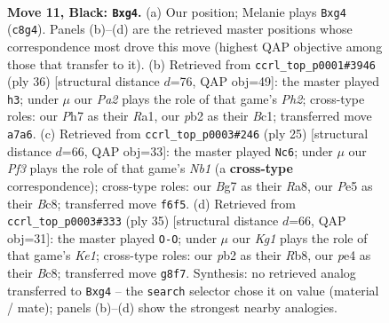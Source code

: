 \documentclass[11pt]{article}
\begin{document}
\clearpage

\begin{figure}[p]\centering
\begin{subfigure}{0.46\textwidth}\centering
\resizebox{\linewidth}{!}{%
\newchessgame
\chessboard[
  setfen={rnb2rk1/ppp3bp/5pp1/4p3/2P1P1P1/2N2N2/PP3PP1/1RBBK2R b K - 0 11},
  showmover=false,
  pgfstyle=straightmove, color=movearrow, markmove={c8-g4}
]}
\caption{}
\end{subfigure}\hfill
\begin{subfigure}{0.46\textwidth}\centering
\resizebox{\linewidth}{!}{%
\newchessgame
\chessboard[
  setfen={r3k2r/pp2bp2/2p1p1n1/3pP3/3P1PBn/2P5/PP1N3P/R1B2RK1 w kq - 3 19},
  showmover=false,
  pgfstyle=straightmove, color=movearrow, markmove={h2-h3}
]}
\caption{}
\end{subfigure}
\\[4pt]
\begin{subfigure}{0.46\textwidth}\centering
\resizebox{\linewidth}{!}{%
\newchessgame
\chessboard[
  setfen={rnb2rk1/pp3pbp/4p1p1/8/3PP3/5N2/P2BBPPP/2R1K2R b K - 1 13},
  showmover=false,
  pgfstyle=straightmove, color=movearrow, markmove={b8-c6}
]}
\caption{}
\end{subfigure}\hfill
\begin{subfigure}{0.46\textwidth}\centering
\resizebox{\linewidth}{!}{%
\newchessgame
\chessboard[
  setfen={1rb1k2r/3nbpp1/p3p2p/1p6/4BP2/PNNR4/1PP3PP/1K5R b k - 2 18},
  showmover=false,
  pgfstyle=straightmove, color=movearrow, markmove={e8-g8}
]}
\caption{}
\end{subfigure}
\caption{\textbf{Move 11, Black: \texttt{Bxg4}.} (a) Our position; Melanie plays \texttt{Bxg4} (\texttt{c8g4}). Panels (b)--(d) are the retrieved master positions whose correspondence most drove this move (highest QAP objective among those that transfer to it). (b) Retrieved from \texttt{ccrl\_top\_p0001\#3946} (ply 36) [structural distance $d$=76, QAP obj=49]: the master played \texttt{h3}; under $\mu$ our \emph{Pa2} plays the role of that game's \emph{Ph2}; cross-type roles: our \emph{P}h7 as their \emph{R}a1, our \emph{p}b2 as their \emph{B}c1; transferred move \texttt{a7a6}. (c) Retrieved from \texttt{ccrl\_top\_p0003\#246} (ply 25) [structural distance $d$=66, QAP obj=33]: the master played \texttt{Nc6}; under $\mu$ our \emph{Pf3} plays the role of that game's \emph{Nb1} (a \textbf{cross-type} correspondence); cross-type roles: our \emph{B}g7 as their \emph{R}a8, our \emph{P}e5 as their \emph{B}c8; transferred move \texttt{f6f5}. (d) Retrieved from \texttt{ccrl\_top\_p0003\#333} (ply 35) [structural distance $d$=66, QAP obj=31]: the master played \texttt{O-O}; under $\mu$ our \emph{Kg1} plays the role of that game's \emph{Ke1}; cross-type roles: our \emph{p}b2 as their \emph{R}b8, our \emph{p}e4 as their \emph{B}c8; transferred move \texttt{g8f7}. Synthesis: no retrieved analog transferred to \texttt{Bxg4} -- the \texttt{search} selector chose it on value (material / mate); panels (b)--(d) show the strongest nearby analogies.}
\label{fig:thought-m21}
\end{figure}
\end{document}
